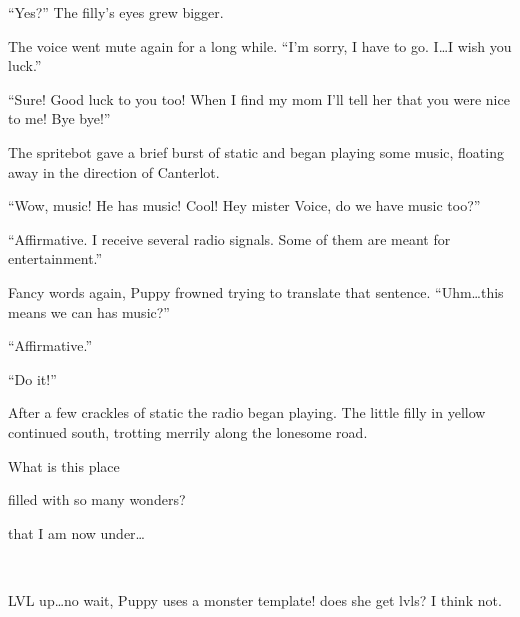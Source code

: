 ``Yes?'' The filly's eyes grew bigger.

The voice went mute again for a long while. ``I'm sorry, I have to go. I\dots I wish you luck.''

``Sure! Good luck to you too! When I find my mom I'll tell her that you were nice to me! Bye bye!''

The spritebot gave a brief burst of static and began playing some music, floating away in the direction of Canterlot.

``Wow, music! He has music! Cool! Hey mister Voice, do we have music too?''

``{\mt Affirmative. I receive several radio signals. Some of them are meant for entertainment.}''

Fancy words again, Puppy frowned trying to translate that sentence. ``Uhm\dots this means we can has music?''

``{\mt Affirmative.}''

``Do it!''

After a few crackles of static the radio began playing. The little filly in yellow continued south, trotting merrily along the lonesome road.

\begin{song}
    What is this place

    filled with so many wonders?

    that I am now under\dots
\end{song}

~\vfill

\begin{engnote}
    LVL up\dots no wait, Puppy uses a monster template! does she get lvls? I think not.
\end{engnote}


